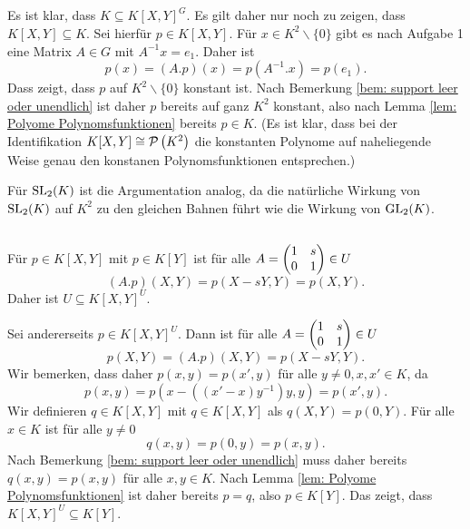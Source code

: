 \documentclass[a4paper,10pt]{article}
\begin{document}
\subsection{}
Es ist klar, dass $K \subseteq K[X,Y]^G$. Es gilt daher nur noch zu zeigen, dass $K[X,Y] \subseteq K$. Sei hierfür $p \in K[X,Y]$. Für $x \in K^2 \smallsetminus \{0\}$ gibt es nach Aufgabe 1 eine Matrix $A \in G$ mit $A^{-1}x = e_1$. Daher ist
\[
 p(x) = (A.p)(x) = p\left(A^{-1}.x\right) = p(e_1).
\]
Dass zeigt, dass $p$ auf $K^2 \smallsetminus \{0\}$ konstant ist. Nach Bemerkung \ref{bem: support leer oder unendlich} ist daher $p$ bereits auf ganz $K^2$ konstant, also nach Lemma \ref{lem: Polyome Polynomsfunktionen} bereits $p \in K$. (Es ist klar, dass bei der Identifikation $K[X,Y] \cong \mathcal{P}\left(K^2\right)$ die konstanten Polynome auf naheliegende Weise genau den konstanen Polynomsfunktionen entsprechen.)

Für $\operatorname{SL}_2(K)$ ist die Argumentation analog, da die natürliche Wirkung von $\operatorname{SL}_2(K)$ auf $K^2$ zu den gleichen Bahnen führt wie die Wirkung von $\operatorname{GL}_2(K)$.


\subsection{}
Für $p \in K[X,Y]$ mit $p \in K[Y]$ ist für alle $A = \begin{pmatrix}1 & s \\ 0 & 1\end{pmatrix} \in U$
\[
 (A.p)(X,Y) = p(X-sY,Y) = p(X,Y).
\]
Daher ist $U \subseteq K[X,Y]^U$.

Sei andererseits $p \in K[X,Y]^U$. Dann ist für alle $A = \begin{pmatrix}1 & s \\ 0 & 1\end{pmatrix} \in U$
\[
 p(X,Y) = (A.p)(X,Y) = p(X-sY,Y).
\]
Wir bemerken, dass daher $p(x,y) = p(x',y)$ für alle $y \neq 0, x, x' \in K$, da
\[
 p(x,y) = p\left(x-\left((x'-x)y^{-1}\right)y,y\right) = p(x',y).
\]
Wir definieren $q \in K[X,Y]$ mit $q \in K[X,Y]$ als $q(X,Y) = p(0,Y)$. Für alle $x \in K$ ist für alle $y \neq 0$
\[
 q(x,y) = p(0,y) = p(x,y).
\]
Nach Bemerkung \ref{bem: support leer oder unendlich} muss daher bereits $q(x,y) = p(x,y)$ für alle $x, y \in K$. Nach Lemma \ref{lem: Polyome Polynomsfunktionen} ist daher bereits $p = q$, also $p \in K[Y]$. Das zeigt, dass $K[X,Y]^U \subseteq K[Y]$.
\end{document}
